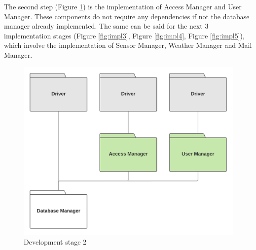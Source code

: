 \documentclass[10pt]{article} %
\begin{document}
The second step (Figure \ref{fig:impl2}) is the implementation of Access Manager and User Manager. These components do not require any dependencies if not 
the database manager already implemented. The same can be said for the next 3 implementation stages (Figure \ref{fig:impl3}, Figure \ref{fig:impl4}, Figure \ref{fig:impl5}), which involve
the implementation of Sensor Manager, Weather Manager and Mail Manager.
\begin{figure}[h!]
    \centering
    \includegraphics[scale=0.4]{images/impl/step2.png}
    \caption{Development stage 2}
    \label{fig:impl2}
\end{figure}
\newpage
\end{document}
